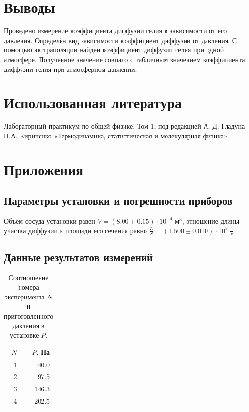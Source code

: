 \documentclass[12pt]{article}
\begin{document}
\section{Выводы}
Проведено измерение коэффициента диффузии гелия в зависимости от его давления. Определён вид 
зависимости коэффициент диффузии от давления. С помощью экстраполяции найден коэффициент диффузии гелия 
при одной атмосфере. Полученное значение совпало с табличным значением коэффициента диффузии гелия при 
атмосферном давлении.

\section{Использованная литература}
\begin{thebibliography}{9}
    Лабораторный практикум по общей физике, Том 1, под редакцией А. Д. Гладуна
    Н.А. Кириченко «Термодинамика, статистическая и молекулярная физика».
\end{thebibliography}

\section{Приложения}
\subsection{Параметры установки и погрешности приборов} \label{app_1}
Объём сосуда установки равен $V = (8.00 \pm 0.05) \cdot 10 ^ {-4}$ $\text{м}^3$, отношение длины участка диффузии к площади его сечения равно 
$\frac{L}{S} = (1.500 \pm 0.010) \cdot 10 ^ {3}$ $\frac{1}{\text{м}}$.     
\subsection{Данные результатов измерений} \label{app_2}
\begin{table}[H]
    \centering
    \begin{tabular}{|r|r|}
        \hline
        $N$ & $P$, Па \\
        \hline
        1   & 40.0    \\
        2   & 97.5    \\
        3   & 146.3   \\
        4   & 202.5   \\
        \hline
    \end{tabular}
    
    \caption{Соотношение номера эксперимента $N$ и приготовленного давления в установке $P$.}
    \label{tab:1}
\end{table}
\end{document}
